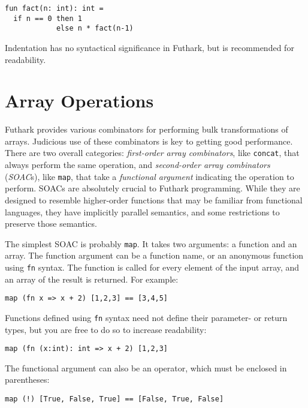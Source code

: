 \documentclass[11pt]{book}
\begin{document}
\begin{lstlisting}
fun fact(n: int): int =
  if n == 0 then 1
            else n * fact(n-1)
\end{lstlisting}

\noindent
Indentation has no syntactical significance in Futhark, but is
recommended for readability.

\section{Array Operations}

Futhark provides various combinators for performing bulk
transformations of arrays.  Judicious use of these combinators is key
to getting good performance.  There are two overall categories:
\textit{first-order array combinators}, like \texttt{concat}, that
always perform the same operation, and \textit{second-order array
  combinators} (\textit{SOAC}s), like \texttt{map}, that take a
\textit{functional argument} indicating the operation to perform.
SOACs are absolutely crucial to Futhark programming.  While they are
designed to resemble higher-order functions that may be familiar from
functional languages, they have implicitly parallel semantics, and
some restrictions to preserve those semantics.

The simplest SOAC is probably \texttt{map}.  It takes two arguments: a
function and an array.  The function argument can be a function name,
or an anonymous function using \texttt{fn} syntax.  The function is
called for every element of the input array, and an array of the result is
returned.  For example:

\begin{lstlisting}
map (fn x => x + 2) [1,2,3] == [3,4,5]
\end{lstlisting}

Functions defined using \texttt{fn} syntax need not define their
parameter- or return types, but you are free to do so to increase
readability:

\begin{lstlisting}
map (fn (x:int): int => x + 2) [1,2,3]
\end{lstlisting}

The functional argument can also be an operator, which must be
enclosed in parentheses:

\begin{lstlisting}
map (!) [True, False, True] == [False, True, False]
\end{lstlisting}
\end{document}
